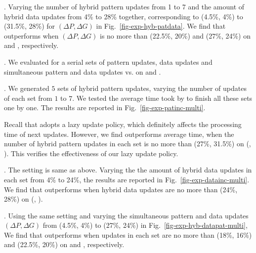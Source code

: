 .  Varying the number of hybrid pattern updates from 1 to 7 and the amount of hybrid data updates from 4\% to 28\% together, corresponding to (4.5\%, 4\%) to (31.5\%, 28\%) for $(\Delta P, \Delta G)$ in Fig.~\ref{fig-exp-hyb-patdata}. We find that \inc outperforms \optgrouprec when $(\Delta P, \Delta G)$ is no more than (22.5\%, 20\%) and (27\%, 24\%) on \citationd and \synthetic, respectively.



. We evaluated \inc for a serial sets of pattern updates, data updates and simultaneous pattern and data updates vs. \optgrouprec on \citationd and \synthetic.


. We generated $5$ sets of hybrid pattern updates, varying the number of updates of each set from $1$ to $7$.
We tested the average time took by \inc to finish all these sets one by one.
The results are reported in Fig.~\ref{fig-exp-patinc-multi}.

Recall that \inc adopts a lazy update policy, which definitely affects the processing time of next updates.
However, we find \inc outperforms \optgrouprec \wrt average time, when the number of hybrid  pattern updates in each set is no more than (27\%, 31.5\%)  on (\citationd, \synthetic). This verifies the effectiveness of our lazy update policy.


. The setting is same as above. Varying the the amount of hybrid data updates in each set from 4\% to 24\%,
the results are reported in Fig.~\ref{fig-exp-datainc-multi}.
We find that \inc outperforms \optgrouprec when hybrid data updates are no more than (24\%, 28\%) on (\citationd, \synthetic).



. Using the same setting and varying the simultaneous pattern and data updates $(\Delta P, \Delta G)$ from (4.5\%, 4\%) to (27\%, 24\%) in Fig.~\ref{fig-exp-hyb-datapat-multi},
We find that \inc outperforms \optgrouprec when updates in each set are no more than (18\%, 16\%) and (22.5\%, 20\%)
on \citationd and \synthetic, respectively.

